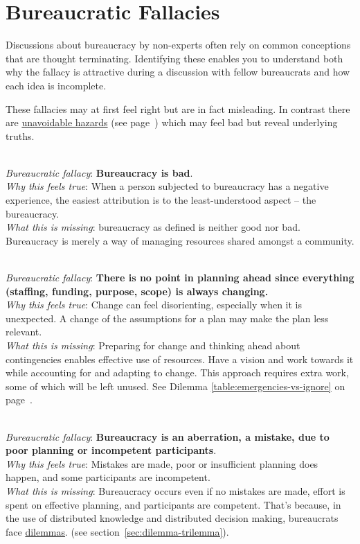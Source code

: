 \section{Bureaucratic Fallacies\label{sec:fallacies}}

Discussions about bureaucracy by non-experts often rely on common conceptions that are \gls{thought terminating}. Identifying these enables you to understand both why the fallacy is attractive during a discussion with fellow bureaucrats and how each idea is incomplete.

These fallacies may at first feel right but are in fact misleading. In contrast there are  \hyperref[sec:unavoidable-hazards]{unavoidable hazards} (see 
page~\pageref{sec:unavoidable-hazards})
which may feel bad but reveal underlying truths.

\ \\
\textit{Bureaucratic fallacy}: \textbf{Bureaucracy is bad}. \\
\textit{Why this feels true}: When a person subjected to bureaucracy has a negative experience, the easiest attribution is to the least-understood aspect -- the bureaucracy.\\
\textit{What this is missing}: \Gls{bureaucracy} as defined is neither good nor bad. Bureaucracy is merely a way of managing  resources shared amongst a community. 

\ \\
\textit{Bureaucratic fallacy}: 
\textbf{There is no point in planning ahead since everything (staffing, funding, purpose, scope) is always changing.}\\
\textit{Why this feels true}: Change can feel disorienting, especially when it is unexpected. A change of the assumptions for a plan may make the plan less relevant. \\
\textit{What this is missing}: Preparing for change and thinking ahead about contingencies enables effective use of resources. Have a vision and work towards it while accounting for and adapting to change. This approach requires extra work, some of which will be left unused. See Dilemma \ref{table:emergencies-vs-ignore} on 
page~\pageref{table:emergencies-vs-ignore}.


\ \\
\textit{Bureaucratic fallacy}: \textbf{Bureaucracy is an aberration, a mistake, due to poor planning or incompetent participants}. \\
\textit{Why this feels true}: Mistakes are made, poor or insufficient planning does happen, and some participants are incompetent.\\
\textit{What this is missing}: Bureaucracy occurs even if no mistakes are made, effort is spent on effective planning, and participants are competent. That's because, in the use of distributed knowledge and distributed decision making, bureaucrats face \hyperref[sec:dilemma-trilemma]{dilemmas}.
\ifsectionref
(see section~\ref{sec:dilemma-trilemma}).
\fi

